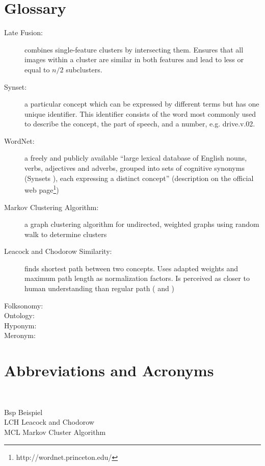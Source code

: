 \section{Glossary} %

\begin{description}
\item[Late Fusion:] combines single-feature clusters by intersecting them. Ensures that all images within a cluster are similar in both features and lead to less or equal to $n/2$ subclusters.

\item[Synset:] a particular concept which can be expressed by different terms but has one unique identifier. This identifier consists of the word most commonly used to describe the concept, the part of speech, and a number, e.g. drive.v.02.

\item[WordNet:] a freely and publicly available ``large lexical database of English nouns, verbs, adjectives and adverbs, grouped into sets of cognitive synonyms (Synsets ), each expressing a distinct concept'' (description on the official web page\footnote{http://wordnet.princeton.edu/})

\item[Markov Clustering Algorithm:] a graph clustering algorithm for undirected, weighted graphs using random walk to determine clusters

\item[Leacock and Chodorow Similarity:] finds shortest path between two concepts. Uses adapted weights and maximum path length as normalization factors. Is perceived as closer to human understanding than regular path (\cite{budanitsky01} and \cite{pedersen2004wordnet})

\item[Folksonomy:]

\item[Ontology:]

\item[Hyponym:]

\item[Meronym:]

\end{description}


\newpage

\section{Abbreviations and Acronyms}

\begin{tabbing}
\hspace*{3cm}\=  \\ \kill

Bsp \> Beispiel\\
LCH \> Leacock and Chodorow\\
MCL \> Markov Cluster Algorithm\\

\end{tabbing}
